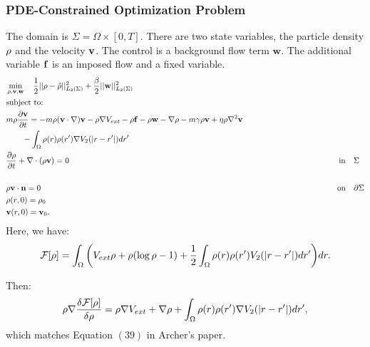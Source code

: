 
\subsubsection{PDE-Constrained Optimization Problem}
The domain is $\Sigma=\Omega \times [0,T]$. There are two state variables, the particle density $\rho$ and the velocity $\mathbf{v}$. The control is a background flow term $\mathbf{w}$. The additional variable $\mathbf{f}$ is an imposed flow and a fixed variable.
\begin{align*}
&\min_{\rho,\mathbf{v},\mathbf{w} } \quad \frac{1}{2}||\rho - \hat {\rho}||_{L_2(\Sigma)}^2  +\frac{\beta}{2}||\mathbf{w}||_{L_2(\Sigma)}^2\\
&\text{subject to:}\\
&m \rho \frac{\partial \mathbf{v}}{\partial t}= - m \rho (\mathbf{v} \cdot \nabla)\mathbf{v} -\rho \nabla V_{ext} -\rho \mathbf{f} -\rho \mathbf{w} - \nabla \rho - m\gamma \rho \mathbf{v} + \eta \rho \nabla^2 \mathbf{v} \\
& \quad \quad -\int_\Omega \rho(r) \rho(r') \nabla V_2(|r-r'|)dr' \\
&\frac{\partial \rho}{\partial t} + \nabla \cdot (\rho \mathbf{v})=0 \qquad\qquad \qquad\qquad\qquad\quad \quad\quad\qquad \qquad\qquad \qquad\qquad\qquad\quad \qquad\qquad\qquad\quad\ \ \text{in} \quad \Sigma\\
\\
&\rho \mathbf{v} \cdot \mathbf{n} =0\qquad\qquad \qquad\qquad\qquad\qquad\qquad\qquad\qquad \qquad\qquad \qquad\qquad\qquad \qquad\qquad\qquad\quad \qquad \text{on} \quad \partial  \Sigma\\
& \rho(r,0)=\rho_0\\
& \mathbf{v}(r,0)=\mathbf{v}_0.
\end{align*}
Here, we have:
\begin{align*}
\mathcal{F}[\rho]=\int_\Omega  \bigg( V_{ext}\rho + \rho (\log \rho -1) +  \frac{1}{2}\int_\Omega \rho(r) \rho(r')V_2(|r-r'|)dr' \bigg) dr.
\end{align*}

Then:
\begin{align*}
\rho \nabla \frac{\delta \mathcal{F}[\rho]}{\delta \rho} = \rho \nabla V_{ext} + \nabla \rho + \int_\Omega \rho(r) \rho(r') \nabla V_2(|r-r'|)dr',
\end{align*}
which matches Equation $(39)$ in Archer's paper.
